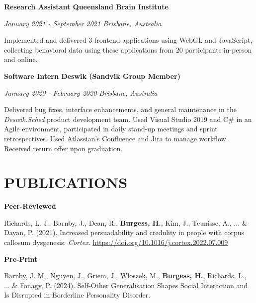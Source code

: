 \documentclass{article}
\begin{document}
  \smallbreak

  {\large\textbf{Research Assistant \hfill Queensland Brain Institute}}

  \textit{January 2021 - September 2021 \hfill Brisbane, Australia}

Implemented and delivered 3 frontend applications using WebGL and JavaScript, collecting behavioral data using these applications from 20 participants in-person and online.

  \smallbreak

  {\large\textbf{Software Intern \hfill Deswik (Sandvik Group Member)}}

  \textit{January 2020 - February 2020 \hfill Brisbane, Australia}

  Delivered bug fixes, interface enhancements, and general maintenance in the \textit{Deswik.Sched} product development team. Used Visual Studio 2019 and C\# in an Agile environment, participated in daily stand-up meetings and sprint retrospectives. Used Atlassian's Confluence and Jira to manage workflow. Received return offer upon graduation.

  \pagebreak

  \begin{comment}
  {\large\textbf{Research Assistant \hfill CSIRO}}

  \textit{June 2019 - July 2019 \hfill Brisbane, Australia}

  Developed a geospatial web application prototype using Google satellite imagery and JavaScript. Required to understand an agricultural context and UX requirements of end-users from subject-matter experts.
  \end{comment}

  \section*{\centering\uppercase{Publications}}

  {\large\textbf{Peer-Reviewed}}

  Richards, L. J., Barnby, J., Dean, R., \textbf{Burgess, H.}, Kim, J., Teunisse, A., ... \& Dayan, P. (2021). Increased persuadability and credulity in people with corpus callosum dysgenesis. \textit{Cortex}.
  \href{https://doi.org/10.1016/j.cortex.2022.07.009}{https://doi.org/10.1016/j.cortex.2022.07.009}

  \smallbreak

  {\large\textbf{Pre-Print}}

  Barnby, J. M., Nguyen, J., Griem, J., Wloszek, M., \textbf{Burgess, H.}, Richards, L., ... \& Fonagy, P. (2024). Self-Other Generalisation Shapes Social Interaction and Is Disrupted in Borderline Personality Disorder.
\end{document}
